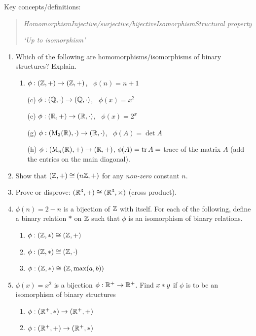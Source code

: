 \begin{exercises}{}
Key concepts/definitions:
\begin{quote}
	\emph{Homomorphism\qquad Injective/surjective/bijective\qquad Isomorphism\qquad Structural property}\par
	\emph{`Up to isomorphism'}
\end{quote}

\begin{enumerate}
	\item Which of the following are homomorphisms/isomorphisms of binary structures? Explain.
  \begin{enumerate}
    \item {} $\phi:(\mathbb{Z},+)\to (\mathbb{Z},+)$, \ $\phi(n)=n+1$
    \item[(c)]  $\phi:(\mathbb{Q},\cdot)\to (\mathbb{Q},\cdot)$, \ $\phi(x)=x^2$
    \item[(e)]  $\phi:(\mathbb{R},+)\to (\mathbb{R},\cdot)$, \ $\phi(x)=2^x$
    \item[(g)] $\phi:(\mathrm{M}_2(\mathbb{R}),\cdot)\to (\mathbb{R},\cdot)$, \ $\phi(A)=\det A$
    \item[(h)] $\phi:(\mathrm{M}_n(\mathbb{R}),+)\to (\mathbb{R},+)$, $\phi(A)=\operatorname{tr} A=$ trace of the matrix $A$ (add the entries on the main diagonal).
  \end{enumerate}
  
  \item Show that $(\mathbb{Z},+)\cong (n\mathbb{Z},+)$ for any \emph{non-zero} constant $n$.
  
  \item Prove or disprove: $(\mathbb{R}^3,+)\cong(\mathbb{R}^3,\times)$ (cross product). 
  
  
  \item $\phi(n)=2-n$ is a bijection of $\mathbb{Z}$ with itself. For each of the following, define a binary relation $*$ on $\mathbb{Z}$ such that $\phi$ is an isomorphism of binary relations.
  \begin{enumerate}
    \item $\phi:(\mathbb{Z},*)\cong (\mathbb{Z},+)$
    \item $\phi:(\mathbb{Z},*)\cong (\mathbb{Z},\cdot)$
    \item $\phi:(\mathbb{Z},*)\cong (\mathbb{Z},\max(a,b))$
  \end{enumerate}
  
  
	\item $\phi(x)=x^2$ is a bijection $\phi:\mathbb{R}^+\to\mathbb{R}^+$. Find $x\mathbin{\ast} y$ if $\phi$ is to be an isomorphism of binary structures
	\begin{enumerate}
	  \item $\phi:(\mathbb{R}^+,\ast)\to(\mathbb{R}^+,+)$
	  \item $\phi:(\mathbb{R}^+,+)\to(\mathbb{R}^+,\ast)$
	\end{enumerate}
  

\end{enumerate}
\end{exercises}
